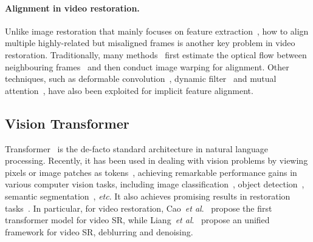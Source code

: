 \documentclass{article}
\newcommand{\etc}{\textit{etc}}
\newcommand{\etal}{\textit{et al}.}
\newlength \g
\begin{document}
\vspace{-3mm}
\paragraph{Alignment in video restoration.}
Unlike image restoration that mainly focuses on feature extraction~\cite{dong2014srcnn, zhang2017DnCNN, zhang2018srmd, zhang2018rcan, liang2021fkp, liang21hcflow, liang21manet, sun2021mefnet, kai2021bsrgan, zhang2022practical}, how to align multiple highly-related but misaligned frames is another key problem in video restoration. Traditionally, many methods~\cite{liao2015video,kappeler2016video,caballero2017VESPCN,liu2017robust,tao2017detail, caballero2017real, xue2019TOFlow-Vimeo-90K, chan2021basicvsr} first estimate the optical flow between neighbouring frames~\cite{dosovitskiy2015flownet,ranjan2017spynet,sun2018pwc} and then conduct image warping for alignment. Other techniques, such as deformable convolution~\cite{dai2017deformable, zhu2019deformable,tian2020tdan, wang2019edvr, chan2021basicvsr++, cao2021videosr}, dynamic filter~\cite{jo2018DUF} and mutual attention~\cite{liang2022vrt}, have also been exploited for implicit feature alignment. 


\subsection{Vision Transformer}
Transformer~\cite{vaswani2017transformer} is the de-facto standard architecture in natural language processing. Recently, it has been used in dealing with vision problems by viewing pixels or image patches as tokens~\cite{carion2020DETR, dosovitskiy2020ViT}, achieving remarkable performance gains in various computer vision tasks, including image classification~\cite{dosovitskiy2020ViT, li2021localvit, liu2021swin, tu2022maxvit}, object detection~\cite{vaswani2021SAhaloing, liu2020deep, xia2022vision}, semantic segmentation~\cite{wu2020visual, dong2021cswin, sun2021boosting}, \etc. It also achieves promising results in restoration tasks~\cite{chen2021IPT, liang21swinir, wang2021uformer, lin2022flow, cao2021videosr, liang2022vrt, fuoli2022fast, geng2022rstt, cao2022vdtr, yun2022coarse, liu2022learning, tu2022maxim, cao2022practical}. In particular, for video restoration, Cao~\etal~\cite{cao2021videosr} propose the first transformer model for video SR, while Liang~\etal~\cite{liang2022vrt} propose an unified framework for video SR, deblurring and denoising.
\end{document}
